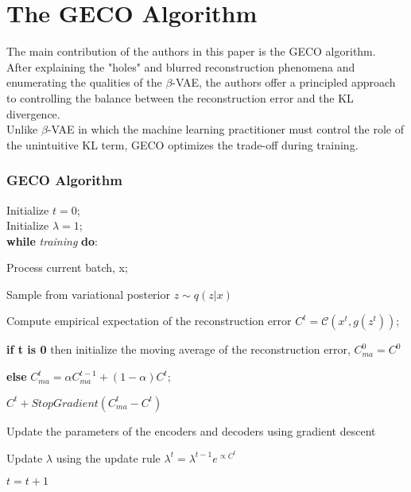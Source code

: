 \chapter*{The GECO Algorithm}
The main contribution of the authors in this paper is the GECO algorithm.\\
After explaining the "holes" and blurred reconstruction phenomena and enumerating the qualities of the $\beta$-VAE, the authors offer a principled approach to controlling the balance between the reconstruction error and the KL divergence.\\
Unlike $\beta$-VAE in which the machine learning practitioner must control the role of the unintuitive KL term, GECO optimizes the trade-off during training.
\subsection*{GECO Algorithm}
Initialize $t = 0$;\\
Initialize $\lambda = 1$;\\
\textbf{while} \textit{training} \textbf{do}:
\renewenvironment{description}[1][0pt]
  {\list{}{\labelwidth=0pt \leftmargin=#1
   \let\makelabel\descriptionlabel}}
  {\endlist}
\begin{description}[1cm]
\item Process current batch, x;
\item Sample from variational posterior $z\sim{q(z|x)}$
\item Compute empirical expectation of the reconstruction error $C^t = \mathcal{C}(x^t,g(z^t))$;
\item \textbf{if t is 0} then initialize the moving average of the reconstruction error, $C_{ma}^0 = C^0$
\item \textbf{else} $C_{ma}^t = \alpha C_{ma}^{t-1} + (1-\alpha)C^t$;
\item $C^t + StopGradient(C_{ma}^t - C^t)$
\item Update the parameters of the encoders and decoders using gradient descent
\item Update $\lambda$ using the update rule $\lambda^t = \lambda^{t-1}e^{\propto C^t}$
\item $t = t+1$
\end{description}

